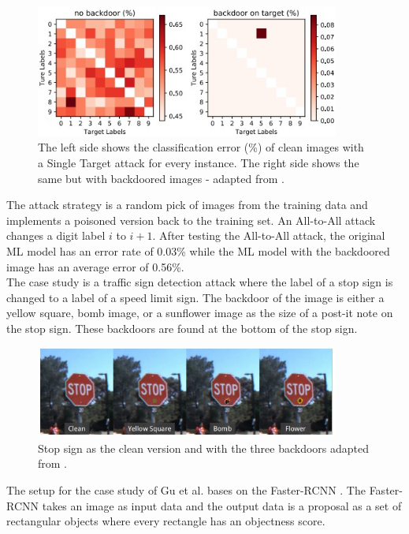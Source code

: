 \begin{figure}[ht!]
  \centering
  \includegraphics[width=10cm]{pictures/mapping_from_i_to_j.jpg}
  \caption{The left side shows the classification error (\%) of clean images with a Single Target attack for every instance. The right side shows the same but with backdoored images - adapted from \cite{DBLP:journals/corr/abs-1708-06733}.}
  \label{fig:mapped_from_i_to_j}
\end{figure}

The attack strategy is a random pick of images from the training data and implements a poisoned version back to the training set. An All-to-All attack changes a digit label $i$ to $i + 1$. After testing the All-to-All attack, the original ML model has an error rate of 0.03\% while the ML model with the backdoored image has an average error of 0.56\%. \\ The case study is a traffic sign detection attack where the label of a stop sign is changed to a label of a speed limit sign. The backdoor of the image is either a yellow square, bomb image, or a sunflower image as the size of a post-it note on the stop sign. These backdoors are found at the bottom of the stop sign.

\begin{figure}[ht!]
  \centering
  \includegraphics[width=10cm]{pictures/stop_sign.jpg}
  \caption{Stop sign as the clean version and with the three backdoors adapted from \cite{DBLP:journals/corr/abs-1708-06733}.}
  \label{fig:stop_sign}
\end{figure}

The setup for the case study of Gu et al. bases on the Faster-RCNN \cite{DBLP:conf/nips/RenHGS15}. The Faster-RCNN takes an image as input data and the output data is a proposal as a set of rectangular objects where every rectangle has an objectness score.

